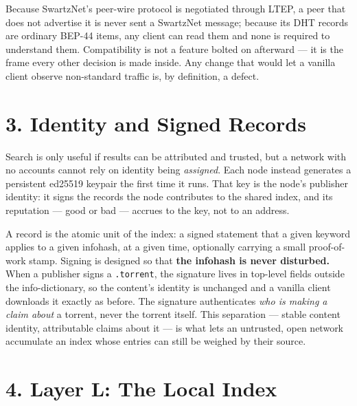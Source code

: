 \documentclass[11pt]{article}
\begin{document}
Because SwartzNet's peer-wire protocol is negotiated through LTEP, a
peer that does not advertise it is never sent a SwartzNet message;
because its DHT records are ordinary BEP-44 items, any client can read
them and none is required to understand them. Compatibility is not a
feature bolted on afterward --- it is the frame every other decision is
made inside. Any change that would let a vanilla client observe
non-standard traffic is, by definition, a defect.

\hypertarget{identity-and-signed-records}{%
\section{3. Identity and Signed
Records}\label{identity-and-signed-records}}

Search is only useful if results can be attributed and trusted, but a
network with no accounts cannot rely on identity being \emph{assigned}.
Each node instead generates a persistent ed25519 keypair the first time
it runs. That key is the node's publisher identity: it signs the records
the node contributes to the shared index, and its reputation --- good or
bad --- accrues to the key, not to an address.

A record is the atomic unit of the index: a signed statement that a
given keyword applies to a given infohash, at a given time, optionally
carrying a small proof-of-work stamp. Signing is designed so that
\textbf{the infohash is never disturbed.} When a publisher signs a
\texttt{.torrent}, the signature lives in top-level fields outside the
info-dictionary, so the content's identity is unchanged and a vanilla
client downloads it exactly as before. The signature authenticates
\emph{who is making a claim about} a torrent, never the torrent itself.
This separation --- stable content identity, attributable claims about
it --- is what lets an untrusted, open network accumulate an index whose
entries can still be weighed by their source.

\hypertarget{layer-l-the-local-index}{%
\section{4. Layer L: The Local Index}\label{layer-l-the-local-index}}
\end{document}
